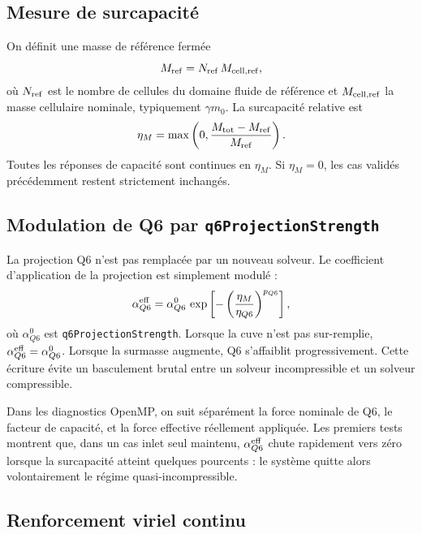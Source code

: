\documentclass[11pt,a4paper]{article}
\begin{document}
\subsection{Mesure de surcapacité}

On définit une masse de référence fermée
\begin{equation}
  M_{\rm ref} = N_{\rm ref}\,M_{\rm cell,ref},
\end{equation}
où \(N_{\rm ref}\) est le nombre de cellules du domaine fluide de référence et \(M_{\rm cell,ref}\) la masse cellulaire nominale, typiquement \(\gamma m_0\). La surcapacité relative est
\begin{equation}
  \eta_M = \max\left(0,\frac{M_{\rm tot}-M_{\rm ref}}{M_{\rm ref}}\right).
\end{equation}
Toutes les réponses de capacité sont continues en \(\eta_M\). Si \(\eta_M=0\), les cas validés précédemment restent strictement inchangés.

\subsection{Modulation de Q6 par \texttt{q6ProjectionStrength}}

La projection Q6 n'est pas remplacée par un nouveau solveur. Le coefficient d'application de la projection est simplement modulé :
\begin{equation}
  \alpha_{Q6}^{\rm eff}
  = \alpha_{Q6}^{0}\,
  \exp\left[-\left(\frac{\eta_M}{\eta_{Q6}}\right)^{p_{Q6}}\right],
\end{equation}
où \(\alpha_{Q6}^{0}\) est \texttt{q6ProjectionStrength}. Lorsque la cuve n'est pas sur-remplie, \(\alpha_{Q6}^{\rm eff}=\alpha_{Q6}^{0}\). Lorsque la surmasse augmente, Q6 s'affaiblit progressivement. Cette écriture évite un basculement brutal entre un solveur incompressible et un solveur compressible.

Dans les diagnostics OpenMP, on suit séparément la force nominale de Q6, le facteur de capacité, et la force effective réellement appliquée. Les premiers tests montrent que, dans un cas inlet seul maintenu, \(\alpha_{Q6}^{\rm eff}\) chute rapidement vers zéro lorsque la surcapacité atteint quelques pourcents : le système quitte alors volontairement le régime quasi-incompressible.

\subsection{Renforcement viriel continu}
\end{document}
